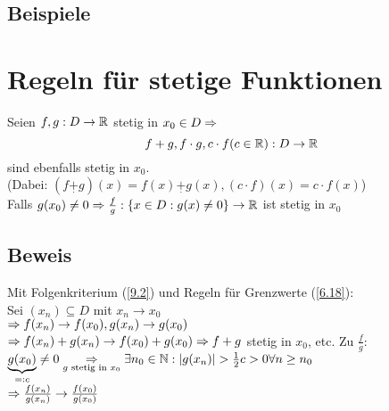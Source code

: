 {\subsection*{Beispiele}

\section{Regeln für stetige Funktionen}\label{9.3}
Seien $f,g: D \to \mathbb{R}$ stetig in $x_0 \in D \Rightarrow$
$$f+g, f \cdot g, c \cdot f (c \in \mathbb{R}): D \to \mathbb{R}$$
sind ebenfalls stetig in $x_0$.\\
(Dabei: $(f \underset{\cdot}{+} g)(x)=f(x) \underset{\cdot}{+} g(x), (c \cdot f)(x) = c \cdot f(x)$)\\
Falls $g(x_0) \neq 0 \Rightarrow \frac{f}{g}: \{x \in D: g(x) \neq 0\} \to \mathbb{R}$ ist stetig in $x_0$

\subsection*{Beweis}
Mit Folgenkriterium (\ref{9.2}) und Regeln für Grenzwerte (\ref{6.18}):\\
Sei $(x_n) \subseteq D$ mit $x_n \to x_0$\\
$\Rightarrow f(x_n) \to f(x_0), g(x_n) \to g(x_0)$\\
$\Rightarrow f(x_n)+g(x_n) \to f(x_0)+g(x_0) \Rightarrow f+g$ stetig in $x_0$, etc.\nl
Zu $\frac{f}{g}$: $\underbrace{g(x_0)}_{=: c} \neq 0 \underset{g \text{ stetig in } x_0}{\Rightarrow} \exists n_0 \in \mathbb{N}: |g(x_n)| > \frac{1}{2} c > 0 \forall n \ge n_0$\\
$\Rightarrow \frac{f(x_n)}{g(x_n)} \to \frac{f(x_0)}{g(x_0)}$

}
